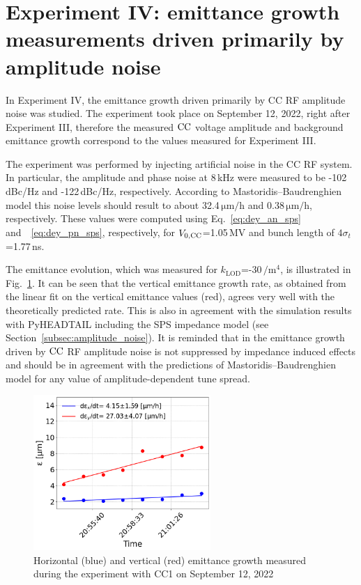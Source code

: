 \section{Experiment IV: emittance growth measurements driven primarily by amplitude noise}\label{sec:exp4_amplitude_noise}

In Experiment IV, the emittance growth driven primarily by CC RF amplitude noise was studied. The experiment took place on September 12, 2022, right after Experiment III, therefore the measured ${\mathrm{CC}}$ voltage amplitude and background emittance growth correspond to the values measured for Experiment III. 


The experiment was performed by injecting artificial noise in the CC RF system. In particular, the amplitude and phase noise at 8\,kHz were measured to be -102\,dBc/Hz and -122\,dBc/Hz, respectively. According to Mastoridis--Baudrenghien model this noise levels should result to about 32.4\,$\mathrm{\mu m/h}$ and 0.38\,$\mathrm{\mu m/h}$, respectively. These values were computed using Eq.~\eqref{eq:dey_an_sps} and~~\eqref{eq:dey_pn_sps}, respectively, for ${V_\mathrm{0, CC}}$=1.05\,MV and bunch length of $4 \sigma_t$=1.77\,ns.


The emittance evolution, which was measured for $k_\mathrm{LOD}$=-30\,$\mathrm{/m^4}$, is illustrated in Fig.~\ref{fig:H_V_emit_growth_Amplitude_noise_coast12}. It can be seen that the vertical emittance growth rate, as obtained from the linear fit on the vertical emittance values (red), agrees very well with the theoretically predicted rate. This is also in agreement with the simulation results with PyHEADTAIL including the SPS impedance model (see Section~\ref{subsec:amplitude_noise}). It is reminded that in the emittance growth driven by ${\mathrm{CC}}$ RF amplitude noise is not suppressed by impedance induced effects and should be in agreement with the predictions of Mastoridis--Baudrenghien model for any value of amplitude-dependent tune spread.


\begin{figure}[!h]
   \centering         
   \includegraphics[width=0.6\textwidth]{images/Ch8/cc_md_sep22_AN_coast12.png}
       \caption{Horizontal (blue) and vertical (red) emittance growth measured during the experiment with CC1 on September 12, 2022}
       \label{fig:H_V_emit_growth_Amplitude_noise_coast12}
\end{figure}






